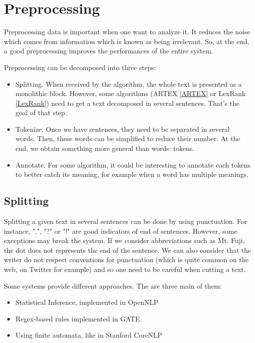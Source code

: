 \documentclass[11pt,a4paper,oldfontcommands]{memoir}
\begin{document}
\section{Preprocessing}

Preprocessing data is important when one want to analyze it. It reduces the noise which comes from information which is known as being irrelevant. So, at the end, a good preprocessing improves the performances of the entire system.

Preprocessing can be decomposed into three steps:

\begin{itemize}

\item Splitting. When received by the algorithm, the whole text is presented as a monolithic block. However, some algorithms (ARTEX \ref{ARTEX} or LexRank \ref{LexRank}) need to get a text decomposed in several sentences. That's the goal of that step.
\item Tokenize. Once we have sentences, they need to be separated in several words. Then, these words can be simplified to reduce their number. At the end, we obtain something more general than words: tokens.
\item Annotate. For some algorithm, it could be interesting to annotate each tokens to better catch its meaning, for example when a word has multiple meanings.

\end{itemize}

\subsection{Splitting}

Splitting a given text in several sentences can be done by using punctuation. For instance, ".", "?" or "!" are good indicators of end of sentences. However, some exceptions may break the system. If we consider abbreviations such as Mt. Fuji, the dot does not represents the end of the sentence. We can also consider that the writer do not respect conventions for punctuation (which is quite common on the web, on Twitter for example) and so one need to be careful when cutting a text.

Some systems provide different approaches. The are three main of them:

\begin{itemize}

\item Statistical Inference, implemented in OpenNLP
\item Regex-based rules implemented in GATE.
\item Using finite automata, like in Stanford CoreNLP

\end{itemize}
\end{document}
